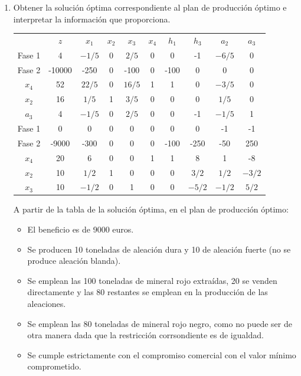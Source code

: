 \begin{enumerate}

\item Obtener la solución óptima correspondiente al plan de producción óptimo e interpretar la información que proporciona.

\begin{center}
\begin{tabular}{c|c|cccccccc|}
 & $z$ & $x_1$ & $x_2$ & $x_3$ & $x_4$ & $h_1$ & $h_3$ & $a_2$ & $a_3$\\ 
Fase 1 & 4 & $-1/5$ & 0 & $2/5$ & 0 & 0 & -1 & $-6/5$ & 0 \\ 
Fase 2 & -10000 & -250 & 0 & -100 & 0 & -100 & 0 & 0 & 0 \\ 
\hline
$x_4$ & 52  & $22/5$ & 0 & $16/5$ & 1 & 1 & 0 & $-3/5$ & 0\\ 
$x_2$ & 16  & $1/5$ & 1 & $3/5$ & 0 & 0 & 0 & $1/5$ & 0\\ 
$a_3$ & 4  & $-1/5$ & 0 & $2/5$ & 0 & 0 & -1 & $-1/5$ & 1\\ 
\hline
Fase 1 & 0 & 0 & 0 & 0 & 0 & 0 & 0 & -1 & -1 \\ 
Fase 2 & -9000 & -300 & 0 & 0 & 0 & -100 & -250 & -50 & 250 \\ 
\hline
$x_4$ & 20  & 6 & 0 & 0 & 1 & 1 & 8 & 1 & -8\\ 
$x_2$ & 10  & $1/2$ & 1 & 0 & 0 & 0 & $3/2$ & $1/2$ & $-3/2$\\ 
$x_3$ & 10  & $-1/2$ & 0 & 1 & 0 & 0 & $-5/2$ & $-1/2$ & $5/2$\\ 
\hline
\end{tabular}
\end{center}




A partir de la tabla de la solución óptima, en el plan de producción óptimo:
\begin{itemize}
    \item El beneficio es de 9000 euros.
    \item Se producen 10 toneladas de aleación dura y 10 de aleación fuerte (no se produce aleación blanda). 
    \item Se emplean las 100 toneladas de mineral rojo extraídas, 20 se venden directamente y las 80 restantes se emplean en la producción de las aleaciones. 
    \item Se emplean las 80 toneladas de mineral rojo negro, como no puede ser de otra manera dada que la restricción corrsondiente es de igualdad. 
    \item Se cumple estrictamente con el compromiso comercial con el valor mínimo comprometido.
\end{itemize}



\end{enumerate}

